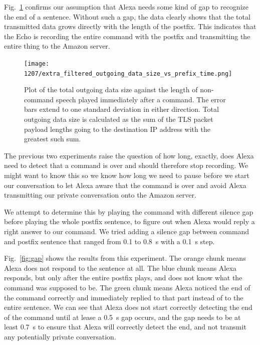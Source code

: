 Fig.~\ref{fig:postfix_nogap} confirms our assumption that Alexa needs some kind of gap to recognize the end of a sentence. Without such a gap, the data clearly shows that the total transmitted data grows directly with the length of the postfix. This indicates that the Echo is recording the entire command with the postfix and transmitting the entire thing to the Amazon server.


\begin{figure}[]
    \centering
    \texttt{[image: 1207/extra\_filtered\_outgoing\_data\_size\_vs\_prefix\_time.png]}
    \caption{Plot of the total outgoing data size against the length of non-command speech played immediately after a command. The error bars extend to one standard deviation in either direction. Total outgoing data size is calculated as the sum of the TLS packet payload lengths going to the destination IP address with the greatest such sum.}
    \label{fig:postfix_nogap}
\end{figure}

The previous two experiments raise the question of how long, exactly, does Alexa need to detect that a command is over and should therefore stop recording. We might want to know this so we know how long we need to pause before we start our conversation to let Alexa aware that the command is over and avoid Alexa transmitting our private conversation onto the Amazon server.

We attempt to determine this by playing the command with different silence gap before playing the whole postfix sentence, to figure out when Alexa would reply a right answer to our command. We tried adding a silence gap between command and postfix sentence that ranged from 0.1 to 0.8~s with a 0.1~s step.

Fig.~\ref{fig:gap} shows the results from this experiment. The orange chunk means Alexa does not respond to the sentence at all. The blue chunk means Alexa responds, but only after the entire postfix plays, and does not know what the command was supposed to be. The green chunk means Alexa noticed the end of the command correctly and immediately replied to that part instead of to the entire sentence. We can see that Alexa does not start correctly detecting the end of the command until at lease a 0.5~s gap occurs, and the gap needs to be at least 0.7~s to ensure that Alexa will correctly detect the end, and not transmit any potentially private conversation.

